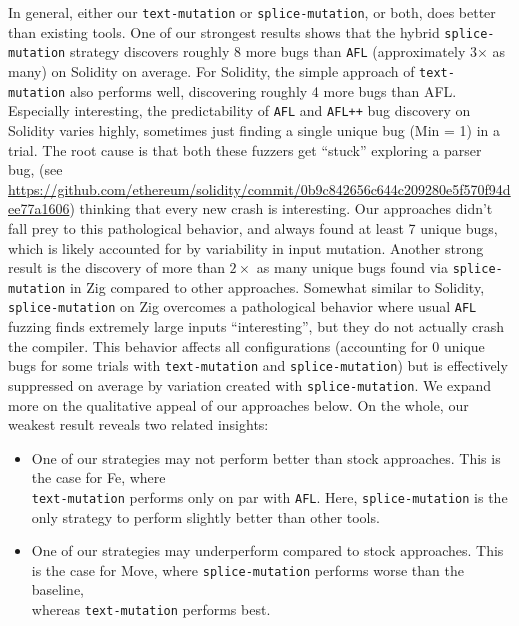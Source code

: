 \begin{sloppypar}
In general, either our \texttt{text-mutation} or \texttt{splice-mutation}, or
both, does better than existing tools. One of our strongest results shows that the
hybrid \texttt{splice-mutation} strategy discovers roughly 8 more bugs than
\texttt{AFL} (approximately 3$\times$ as many) on Solidity on average. For Solidity,
the simple approach of \texttt{text-mutation} also performs well, discovering
roughly 4 more bugs than AFL. Especially interesting, the predictability of
\texttt{AFL} and \texttt{AFL++} bug discovery on Solidity varies highly,
sometimes just finding a single unique bug (Min = 1) in a trial. The root cause
is that both these fuzzers get ``stuck'' exploring a parser
bug, (see 
\url{https://github.com/ethereum/solidity/commit/0b9c842656c644c209280e5f570f94dee77a1606})
thinking that every new crash is
interesting. Our approaches didn't fall prey to this pathological behavior, and
always found at least 7 unique bugs, which is likely accounted for by
variability in input mutation. Another strong result is the discovery of more than $2\times$
as many unique bugs found via \texttt{splice-mutation} in Zig compared to other approaches.
Somewhat similar to Solidity, \texttt{splice-mutation} on Zig overcomes
a pathological behavior where usual \texttt{AFL} fuzzing finds
extremely large inputs ``interesting'', but they do not actually crash
the compiler. This behavior affects all configurations (accounting for 0 unique bugs for some trials with \texttt{text-mutation} and \texttt{splice-mutation}) but is effectively suppressed on average by variation created with \texttt{splice-mutation}. We expand more on the qualitative appeal of our approaches below.
On the whole, our weakest result reveals two related
insights:
\end{sloppypar}

\begin{itemize}
\item One of our strategies may not perform better than stock approaches. This is the case for Fe, where \\ \texttt{text-mutation} performs only on par with \texttt{AFL}. Here, \texttt{splice-mutation} is the only strategy to perform slightly better than other tools.
\item One of our strategies may underperform compared to stock approaches. This is the case for Move, where \texttt{splice-mutation} performs worse than the baseline, \\ whereas \texttt{text-mutation} performs best.
\end{itemize}

